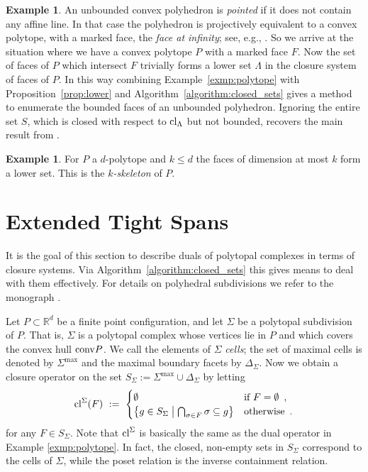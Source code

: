 \documentclass[11pt,a4paper]{amsart}
\theoremstyle{definition}
\newtheorem{example}[definition]{Example}
\theoremstyle{plain}
\begin{document}
\begin{example}
  An unbounded convex polyhedron is \emph{pointed} if it does not contain any affine line.
  In that case the polyhedron is projectively equivalent to a convex polytope, with a marked face, the \emph{face at infinity}; see, e.g., \cite[Theorem~3.36]{Polyhedral+Methods}.
  So we arrive at the situation where we have a convex polytope $P$ with a marked face $F$.
  Now the set of faces of $P$ which intersect $F$ trivially forms a lower set $\Lambda$ in the closure system of faces of $P$.
  In this way combining Example~\ref{exmp:polytope} with Proposition~\ref{prop:lower} and Algorithm~\ref{algorithm:closed_sets} gives a method to enumerate the bounded faces of an unbounded polyhedron.
  Ignoring the entire set $S$, which is closed with respect to ${\textnormal{cl}}_\Lambda$ but not bounded, recovers the main result from \cite{HerrmannJoswigPfetsch:2013}.
\end{example}

\begin{example}
  For $P$ a $d$-polytope and $k\leq d$ the faces of dimension at most $k$ form a lower set.
  This is the \emph{$k$-skeleton} of $P$.
\end{example}

\section{Extended Tight Spans}\label{sec:tight_spans}
\noindent
It is the goal of this section to describe duals of polytopal complexes in terms of closure systems.
Via Algorithm~\ref{algorithm:closed_sets} this gives means to deal with them effectively.
For details on polyhedral subdivisions we refer to the monograph \cite{Triangulations}.

Let $P\subset{\mathbb{R}}^d$ be a finite point configuration, and let $\Sigma$ be a polytopal subdivision of $P$.
That is, $\Sigma$ is a polytopal complex whose vertices lie in $P$ and which covers the convex hull ${{\rm conv}} P$.
We call the elements of $\Sigma$ \emph{cells}; the set of maximal cells is denoted by $\Sigma^{\max}$ and the maximal boundary facets by $\Delta_\Sigma$.
Now we obtain a closure operator on the set $S_\Sigma := \Sigma^{\max} \cup \Delta_\Sigma$ by letting
\begin{equation}
 {\textnormal{cl}}^\Sigma(F) \ := \   
  \begin{cases}
    \emptyset & \textnormal{if } F=\emptyset \enspace, \\
    \left\{ g \in S_\Sigma\;\middle\vert\; \bigcap_{\sigma \in F} \sigma \subseteq g\right\} & \textnormal{otherwise}\enspace.
  \end{cases}
\end{equation}
for any $F\in S_\Sigma$.
Note that ${\textnormal{cl}}^\Sigma$ is basically the same as the dual operator in Example \ref{exmp:polytope}.
In fact, the closed, non-empty sets in $S_\Sigma$ correspond to the cells of $\Sigma$, while the poset relation is the inverse containment relation.
\end{document}
